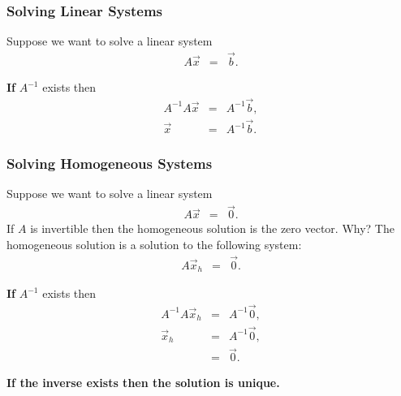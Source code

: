 \begin{frame}
  \frametitle{Solving Linear Systems}

  Suppose we want to solve a linear system
  \begin{eqnarray*}
    A \vec{x} & = & \vec{b}.
  \end{eqnarray*}

  \textbf{If} $A^{-1}$ exists then 
  \begin{eqnarray*}
    A^{-1} A \vec{x} & = & A^{-1} \vec{b}, \\
    \vec{x} & = & A^{-1} \vec{b}.
  \end{eqnarray*}


\end{frame}

\begin{frame}
  \frametitle{Solving Homogeneous Systems}
  {\color{blue}
  Suppose we want to solve a linear system
  \begin{eqnarray*}
    A \vec{x} & = & \vec{0}.
  \end{eqnarray*}
  If $A$ is invertible then the homogeneous solution is the
  zero vector.
  }
  {\color{red}Why?} 
   The homogeneous solution is a solution to the following system:
  \begin{eqnarray*}
    A \vec{x}_h & = & \vec{0}.
  \end{eqnarray*}

  \textbf{If} $A^{-1}$ exists then 
  \begin{eqnarray*}
    A^{-1} A \vec{x}_h & = & A^{-1} \vec{0}, \\
    \vec{x}_h & = & A^{-1} \vec{0}, \\
    & = & \vec{0}.
  \end{eqnarray*}

  \textbf{\color{red}If the inverse exists then the solution is unique.}

\end{frame}





